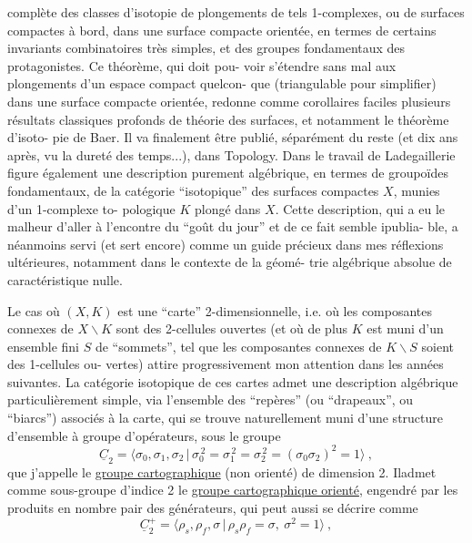 
complète des classes d'isotopie de plongements de tels 1-complexes,
ou de surfaces compactes à bord, dans une surface compacte orientée,
en termes de certains invariants combinatoires très simples, et des
groupes fondamentaux des protagonistes. Ce théorème, qui doit pou-%
voir s'étendre sans mal aux plongements d'un espace compact quelcon-%
que (triangulable pour simplifier) dans une surface compacte orientée,
redonne comme corollaires faciles plusieurs résultats classiques
profonds de théorie des surfaces, et notamment le théorème d'isoto-%
pie de Baer. Il va finalement être publié, séparément du reste (et
dix ans après, vu la dureté des temps...), dans Topology. Dans le
travail de Ladegaillerie figure également une description purement
algébrique, en termes de groupoïdes fondamentaux, de la catégorie
``isotopique'' des surfaces compactes $X$, munies d'un 1-complexe to-%
pologique $K$ plongé dans $X$. Cette description, qui a eu le malheur
d'aller à l'encontre du ``goût du jour'' et de ce fait semble ipublia-%
ble, a néanmoins servi (et sert encore) comme un guide précieux dans
mes réflexions ultérieures, notamment dans le contexte de la géomé-%
trie algébrique absolue de caractéristique nulle.

Le cas où $(X,K)$ est une ``carte'' 2-dimensionnelle, i.e.
où les composantes connexes de $X\backslash K$ sont des 2-cellules ouvertes
(et où de plus $K$ est muni d'un ensemble fini $S$ de ``sommets'',
tel que les composantes connexes de $K\backslash S$ soient des 1-cellules ou-%
vertes) attire progressivement mon attention dans les années suivantes.
La catégorie isotopique de ces cartes admet une description algébrique
particulièrement simple, via l'ensemble des ``repères'' (ou ``drapeaux'',
ou ``biarcs'') associés à la carte, qui se trouve naturellement muni
d'une structure d'ensemble à groupe d'opérateurs, sous le groupe
\[ \underline{C}_2 = \langle \sigma_0,\sigma_1,\sigma_2 \,|\, \sigma_0^{\,2} = \sigma_1^{\,2} = \sigma_2^{\,2} = (\sigma_0\sigma_2)^2 = 1 \rangle \ , \]
que j'appelle le \uline{groupe cartographique} (non orienté) de dimension 2.
Iladmet comme sous-groupe d'indice 2 le \uline{groupe cartographique orienté},
engendré par les produits en nombre pair des générateurs, qui peut
aussi se décrire comme
\[ \underline{C}_2^{+} = \langle \rho_s,\rho_f,\sigma \,|\, \rho_s\rho_f = \sigma,\ \sigma^2 = 1 \rangle \ , \]


